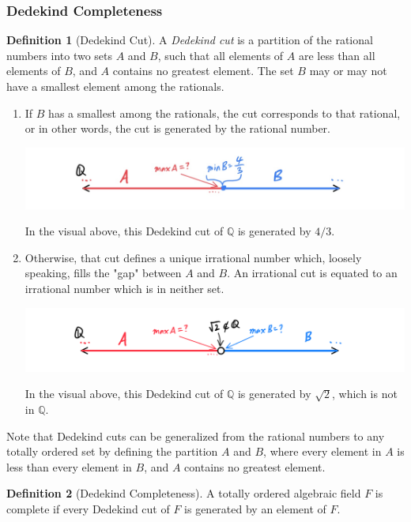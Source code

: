 \documentclass{article}
\theoremstyle{remark}
\theoremstyle{definition}
\newtheorem{definition}{Definition}[section]
\begin{document}
\subsubsection{Dedekind Completeness}
\begin{definition}[Dedekind Cut]
A \textit{Dedekind cut} is a partition of the rational numbers into two sets $A$ and $B$, such that all elements of $A$ are less than all elements of $B$, and $A$ contains no greatest element. The set $B$ may or may not have a smallest element among the rationals. 
\begin{enumerate}
  \item If $B$ has a smallest among the rationals, the cut corresponds to that rational, or in other words, the cut is generated by the rational number. 
  \begin{center}
    \includegraphics[scale=0.25]{img/Dedekind_Cut_Rational.PNG}
  \end{center}
  In the visual above, this Dedekind cut of $\mathbb{Q}$ is generated by $4/3$. 
  \item Otherwise, that cut defines a unique irrational number which, loosely speaking, fills the "gap" between $A$ and $B$. An irrational cut is equated to an irrational number which is in neither set. 
  \begin{center}
    \includegraphics[scale=0.25]{img/Dedekind_Cut_Irrational.PNG}
  \end{center}
  In the visual above, this Dedekind cut of $\mathbb{Q}$ is generated by $\sqrt{2}$, which is not in $\mathbb{Q}$. 
\end{enumerate}
Note that Dedekind cuts can be generalized from the rational numbers to any totally ordered set by defining the partition $A$ and $B$, where every element in $A$ is less than every element in $B$, and $A$ contains no greatest element. 
\end{definition}

\begin{definition}[Dedekind Completeness]
A totally ordered algebraic field $F$ is complete if every Dedekind cut of $F$ is generated by an element of $F$. 
\end{definition}
\end{document}
